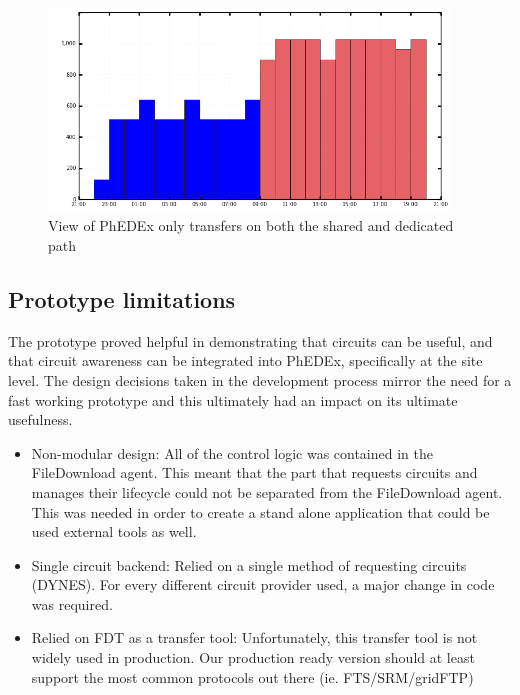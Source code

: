 \begin{figure}[h]
  \centering
  \includegraphics[width=0.95\textwidth]{Figures/FileDownload_PhEDEx_all_paths.png}
  \caption{View of PhEDEx only transfers on both the shared and dedicated path}
  \label{fig:combined_phedex_transfers}
\end{figure} 

\subsection{Prototype limitations}

The prototype proved helpful in demonstrating that circuits can be useful, and that circuit 
awareness can be integrated into PhEDEx, specifically at the site level. The design decisions 
taken in the development process mirror the need for a fast working prototype and this 
ultimately had an impact on its ultimate usefulness.

\begin{itemize}
  \item Non-modular design: All of the control logic was contained in the FileDownload agent.
  This meant that the part that requests circuits and manages their lifecycle could not be 
  separated from the FileDownload agent. This was needed in order to create a stand alone 
  application that could be used external tools as well.
  \item Single circuit backend: Relied on a single method of requesting circuits (DYNES). 
  For every different circuit provider used, a major change in code was required.
  \item Relied on FDT as a transfer tool: Unfortunately, this transfer tool is not widely used
  in production. Our production ready version should at least support the most common protocols
  out there (ie. FTS/SRM/gridFTP)
\end{itemize}

